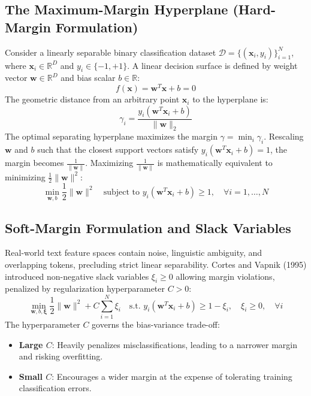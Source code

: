 \documentclass[12pt]{article}
\begin{document}
\subsection{The Maximum-Margin Hyperplane (Hard-Margin Formulation)}
Consider a linearly separable binary classification dataset $\mathcal{D} = \{(\mathbf{x}_i, y_i)\}_{i=1}^N$, where $\mathbf{x}_i \in \mathbb{R}^D$ and $y_i \in \{-1, +1\}$. A linear decision surface is defined by weight vector $\mathbf{w} \in \mathbb{R}^D$ and bias scalar $b \in \mathbb{R}$:
\begin{equation}
    f(\mathbf{x}) = \mathbf{w}^T \mathbf{x} + b = 0
\end{equation}
The geometric distance from an arbitrary point $\mathbf{x}_i$ to the hyperplane is:
\begin{equation}
    \gamma_i = \frac{y_i (\mathbf{w}^T \mathbf{x}_i + b)}{\|\mathbf{w}\|_2}
\end{equation}
The optimal separating hyperplane maximizes the margin $\gamma = \min_i \gamma_i$. Rescaling $\mathbf{w}$ and $b$ such that the closest support vectors satisfy $y_i(\mathbf{w}^T \mathbf{x}_i + b) = 1$, the margin becomes $\frac{1}{\|\mathbf{w}\|}$. Maximizing $\frac{1}{\|\mathbf{w}\|}$ is mathematically equivalent to minimizing $\frac{1}{2}\|\mathbf{w}\|^2$:
\begin{equation}
    \min_{\mathbf{w}, b} \frac{1}{2} \|\mathbf{w}\|^2 \quad \text{subject to } y_i(\mathbf{w}^T \mathbf{x}_i + b) \ge 1, \quad \forall i = 1, \dots, N
\end{equation}

\subsection{Soft-Margin Formulation and Slack Variables}
Real-world text feature spaces contain noise, linguistic ambiguity, and overlapping tokens, precluding strict linear separability. Cortes and Vapnik (1995) introduced non-negative slack variables $\xi_i \ge 0$ allowing margin violations, penalized by regularization hyperparameter $C > 0$:
\begin{equation}
    \min_{\mathbf{w}, b, \boldsymbol{\xi}} \frac{1}{2} \|\mathbf{w}\|^2 + C \sum_{i=1}^{N} \xi_i \quad \text{s.t. } y_i(\mathbf{w}^T \mathbf{x}_i + b) \ge 1 - \xi_i, \quad \xi_i \ge 0, \quad \forall i
\end{equation}
The hyperparameter $C$ governs the bias-variance trade-off:
\begin{itemize}
    \item \textbf{Large $C$}: Heavily penalizes misclassifications, leading to a narrower margin and risking overfitting.
    \item \textbf{Small $C$}: Encourages a wider margin at the expense of tolerating training classification errors.
\end{itemize}
\end{document}
